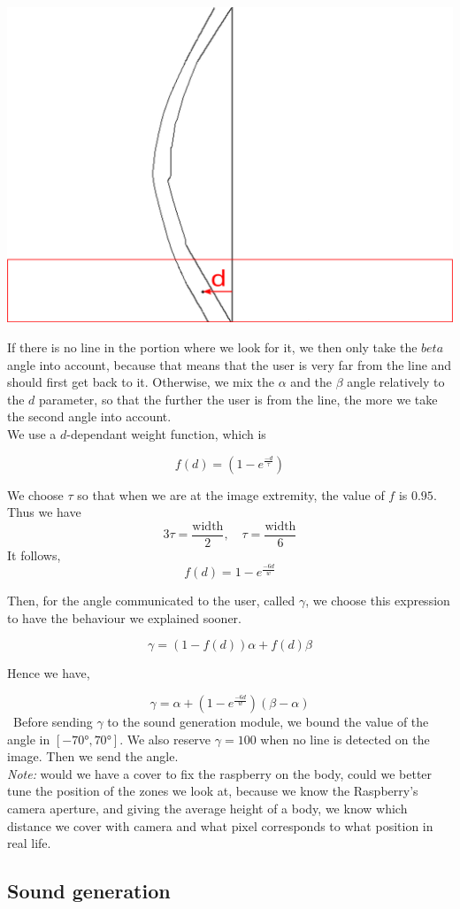 \documentclass{rapport}
\begin{document}
\begin{center}
    \includegraphics[width=0.3\linewidth]{distance_bas_barycentre.png}
\end{center}
If there is no line in the portion where we look for it, we then only take the \(beta\) angle into account, because that means that the user is very far from the line and should first get back to it. Otherwise, we mix the \(\alpha\) and the \(\beta\) angle relatively to the \(d\) parameter, so that the further the user is from the line, the more we take the second angle into account.\\

We use a \(d\)-dependant weight function, which is

\[ f(d) = (1 - e^{\frac{-d}{\tau}}) \]

We choose \(\tau\) so that when we are at the image extremity, the value of \(f\) is \(0.95\). Thus we have
\[ 3\tau = \frac{\text{width}}{2}, \quad \tau = \frac{\text{width}}{6} \]
It follows,
\[f(d) = 1 - e^{\frac{-6d}{w}}\]

Then, for the angle communicated to the user, called \(\gamma\), we choose this expression to have the behaviour we explained sooner.

\[ \gamma = (1 - f(d))\alpha + f(d)\beta \]

Hence we have,

\[ \gamma = \alpha + (1 - e^{\frac{-6d}{w}})(\beta - \alpha) \]\
Before sending \(\gamma\) to the sound generation module, we bound the value of the angle in \([-70°, 70°]\). We also reserve \(\gamma = 100\) when no line is detected on the image. Then we send the angle.\\
\textit{Note:} would we have a cover to fix the raspberry on the body, could we better tune the position of the zones we look at, because we know the Raspberry's camera aperture, and giving the average height of a body, we know which distance we cover with camera and what pixel corresponds to what position in real life.

\subsection {Sound generation}
\end{document}

